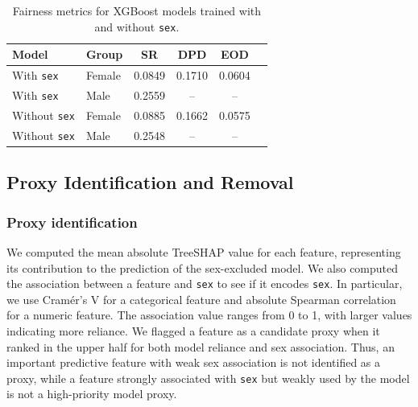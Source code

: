 \documentclass{article}
\begin{document}
\begin{table}[t]
  \centering
  \caption{Fairness metrics for XGBoost models trained with and without \texttt{sex}.}
  \label{tab:sex-feature-fairness}
  \footnotesize
  \begin{tabular}{llcccc}
    \toprule
    Model & Group & SR & DPD & EOD \\
    \midrule
    With \texttt{sex} & Female & 0.0849 & 0.1710 & 0.0604 \\
    With \texttt{sex} & Male   & 0.2559 & -- & -- \\
    \midrule
    Without \texttt{sex} & Female & 0.0885 & 0.1662 & 0.0575 \\
    Without \texttt{sex} & Male   & 0.2548 & -- & -- \\
    \bottomrule
  \end{tabular}
\end{table}

\subsection{Proxy Identification and Removal}

\subsubsection{Proxy identification}
We computed the mean absolute TreeSHAP value for each feature, representing
its contribution to the prediction of the sex-excluded model. We also computed
the association between a feature and \texttt{sex} to see if it encodes \texttt{sex}.
In particular, we use Cramér's V for a categorical feature and absolute Spearman 
correlation for a numeric feature. The association value ranges from 0 to 1, with
larger values indicating more reliance. We flagged a feature as a
candidate proxy when it ranked in the upper half for both model reliance and
sex association. Thus, an important predictive
feature with weak sex association is not identified as a proxy, while a
feature strongly associated with \texttt{sex} but weakly used by the model is
not a high-priority model proxy.
\end{document}
